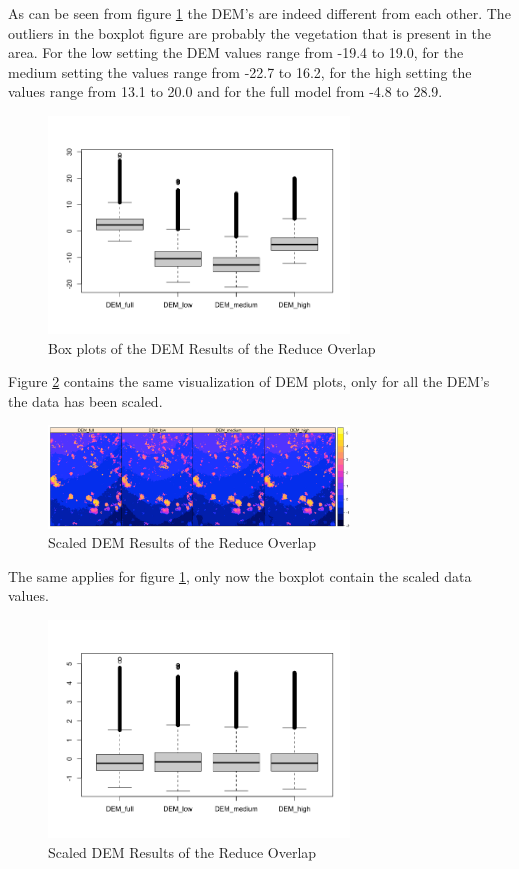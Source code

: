 \documentclass{isprs} %
\begin{document}
As can be seen from figure \ref{fig:BoxPlot_unscaled} the DEM's are indeed different from each other. 
The outliers in the boxplot figure are probably the vegetation that is present in the area.
For the low setting the DEM values range from -19.4 to 19.0, for the medium setting the values range from -22.7 to 16.2, for the high setting the values range from 13.1 to 20.0 and for the full model from -4.8 to 28.9.

\begin{figure}[htp]
    \centering
    \includegraphics[width=8cm]{DemBoxplot.png}
    \caption{Box plots of the DEM Results of the Reduce Overlap}
    \label{fig:BoxPlot_unscaled}
\end{figure}

Figure \ref{fig:DemPlot_scaled} contains the same visualization of DEM plots, only for all the DEM's the data has been scaled.

\begin{figure}[htp]
    \centering
    \includegraphics[width=8cm]{DemPlots_scaled.png}
    \caption{Scaled DEM Results of the Reduce Overlap}
    \label{fig:DemPlot_scaled}
\end{figure}

The same applies for figure \ref{fig:BoxPlot_unscaled}, only now the boxplot contain the scaled data values.

\begin{figure}[htp]
    \centering
    \includegraphics[width=8cm]{DemBoxPlot_Scaled.png}
    \caption{Scaled DEM Results of the Reduce Overlap}
    \label{fig:BoxPlot_scaled}
\end{figure}
\end{document}

